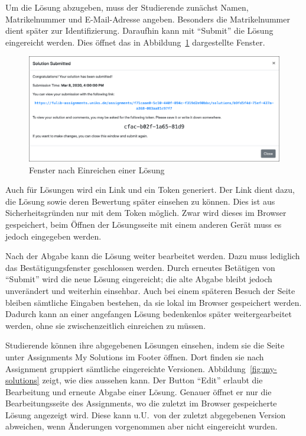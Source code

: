 Um die Lösung abzugeben, muss der Studierende zunächst Namen, Matrikelnummer und E-Mail-Adresse angeben.
Besonders die Matrikelnummer dient später zur Identifizierung.
Daraufhin kann mit ``Submit'' die Lösung eingereicht werden.
Dies öffnet das in Abbildung~\ref{fig:solution-submitted} dargestellte Fenster.

\begin{figure}
    \centering
    \includegraphics[width=\textwidth]{chapter/fulib.org/img/solution-submitted.png}
    \caption{Fenster nach Einreichen einer Lösung}
    \label{fig:solution-submitted}
\end{figure}

Auch für Lösungen wird ein Link und ein Token generiert.
Der Link dient dazu, die Lösung sowie deren Bewertung später einsehen zu können.
Dies ist aus Sicherheitsgründen nur mit dem Token möglich.
Zwar wird dieses im Browser gespeichert, beim Öffnen der Lösungsseite mit einem anderen Gerät muss es jedoch eingegeben werden.

Nach der Abgabe kann die Lösung weiter bearbeitet werden.
Dazu muss lediglich das Bestätigungsfenster geschlossen werden.
Durch erneutes Betätigen von ``Submit'' wird die neue Lösung eingereicht;
die alte Abgabe bleibt jedoch unverändert und weiterhin einsehbar.
Auch bei einem späteren Besuch der Seite bleiben sämtliche Eingaben bestehen, da sie lokal im Browser gespeichert werden.
Dadurch kann an einer angefangen Lösung bedenkenlos später weitergearbeitet werden,
ohne sie zwischenzeitlich einreichen zu müssen.

Studierende können ihre abgegebenen Lösungen einsehen, indem sie die Seite unter Assignments \textrightarrow My Solutions im Footer öffnen.
Dort finden sie nach Assignment gruppiert sämtliche eingereichte Versionen.
Abbildung~\ref{fig:my-solutions} zeigt, wie dies aussehen kann.
Der Button ``Edit'' erlaubt die Bearbeitung und erneute Abgabe einer Lösung.
Genauer öffnet er nur die Bearbeitungsseite des Assignments,
wo die zuletzt im Browser gespeicherte Lösung angezeigt wird.
Diese kann u.U.\ von der zuletzt abgegebenen Version abweichen,
wenn Änderungen vorgenommen aber nicht eingereicht wurden.

